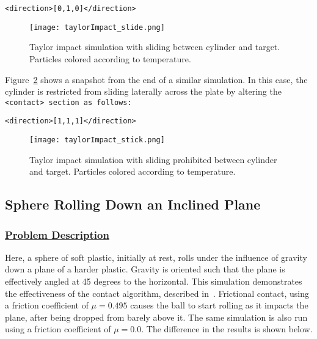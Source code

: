 \begin{Verbatim}[fontsize=\footnotesize]
        <direction>[0,1,0]</direction>
\end{Verbatim}

\begin{figure}
  \center
  \texttt{[image: taylorImpact\_slide.png]}
  \caption{Taylor impact simulation with sliding between cylinder and
           target.  Particles colored according to temperature.}
  \label{fig:taylorImpact_slide}
\end{figure}

Figure~\ref{fig:taylorImpact_stick} shows a snapshot from the end of a
similar simulation.  In this case, the cylinder is restricted from sliding
laterally across the plate by altering the \tt <contact> \normalfont
section as follows:
\begin{Verbatim}[fontsize=\footnotesize]
        <direction>[1,1,1]</direction>
\end{Verbatim}

\begin{figure}
  \center
  \texttt{[image: taylorImpact\_stick.png]}
  \caption{Taylor impact simulation with sliding prohibited between
           cylinder and target.  Particles colored according to temperature.}
  \label{fig:taylorImpact_stick}
\end{figure}

\subsection*{\center Sphere Rolling Down an Inclined Plane}
\subsubsection*{\underline{Problem Description}}
Here, a sphere of soft plastic, initially at rest, rolls under the
influence of gravity down a plane of a harder plastic.  Gravity is
oriented such that the plane is effectively angled at 45 degrees to
the horizontal.  This simulation demonstrates the effectiveness of
the contact algorithm, described in~\cite{bard01}.  Frictional
contact, using a friction coefficient of $\mu = 0.495$ causes the ball
to start rolling as it impacts the plane, after being dropped from
barely above it.  The same simulation is also run using a friction
coefficient of $\mu = 0.0$.  The difference in the results is shown
below.
 
